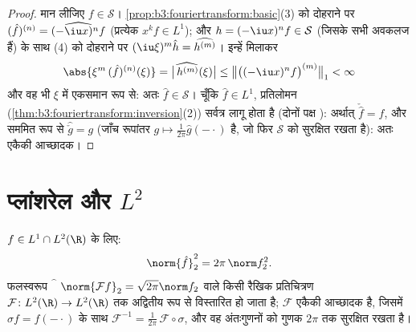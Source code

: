 \begin{proof}
मान लीजिए $f \in \mathcal S$। \cref{prop:b3:fouriertransform:basic}(3) को दोहराने पर $(\hat f)^{(n)} =
\widehat{(-\iu x)^nf}$ (प्रत्येक $x^kf \in L^1$);
और $h = (-\iu x)^nf \in \mathcal S$ (जिसके सभी अवकलज  हैं) के साथ (4) को दोहराने पर
$(\iu\xi)^m\hat h =
\widehat{h^{(m)}}$। इन्हें मिलाकर
\[
\abs{\xi^m\,(\hat f)^{(n)}(\xi)}
= \bigl|\widehat{\,h^{(m)}}(\xi)\bigr|
\leq \bigl\|\bigl((-\iu x)^nf\bigr)^{(m)}\bigr\|_1 < \infty
\]
और वह भी $\xi$ में एकसमान रूप से: अतः $\hat f \in \mathcal S$। चूँकि $\hat f \in L^1$,
प्रतिलोमन (\cref{thm:b3:fouriertransform:inversion}(2)) सर्वत्र लागू होता है (दोनों पक्ष ):
अर्थात् $\check{\hat f} = f$, और सममित रूप से $\widehat{\check g} = g$ (जाँच रूपांतर $g \mapsto \frac1{2\pi}\hat g(-\cdot)$ है, जो
फिर $\mathcal S$ को सुरक्षित रखता है): अतः एकैकी आच्छादक।
\end{proof}

\section{प्लांशरेल और \texorpdfstring{$L^2$}{L2}}

\begin{theorem}[प्लांशरेल]\label{thm:b3:fouriertransform:plancherel}
$f \in L^1 \cap L^2(\R)$ के लिए:
\[
\norm{\hat f}_2^2 = 2\pi\,\norm f_2^2 .
\]
फलस्वरूप $\widehat{\phantom f}$ $\norm{\mathcal Ff}_2 = \sqrt{2\pi}\norm f_2$ वाले किसी  रैखिक प्रतिचित्रण $\mathcal F \colon L^2(\R) \to L^2(\R)$ तक
अद्वितीय रूप से विस्तारित हो जाता है; $\mathcal
F$ एकैकी आच्छादक है,
जिसमें $\sigma f =
f(-\cdot)$ के साथ $\mathcal F^{-1} =
\frac1{2\pi}\,\mathcal F\circ\sigma$, और वह अंतःगुणनों को गुणक $2\pi$ तक
सुरक्षित रखता है।
\end{theorem}

